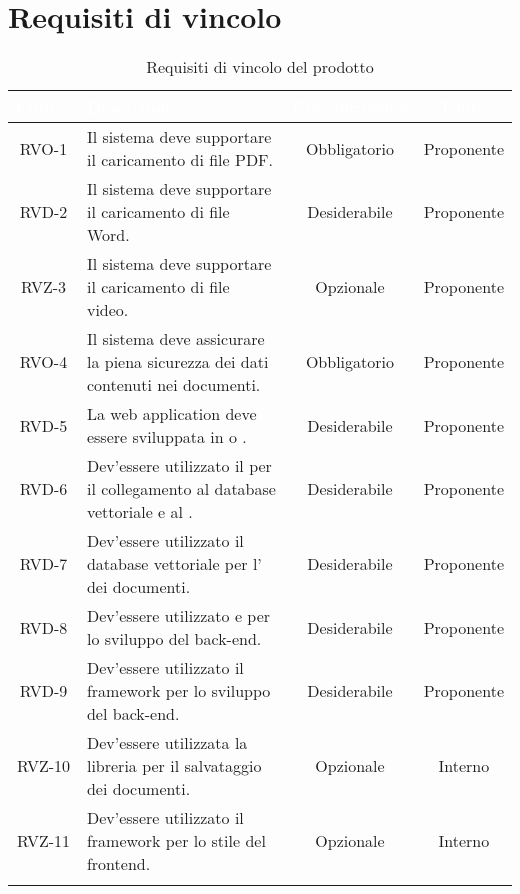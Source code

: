 \section{Requisiti di vincolo}

\begingroup
\setlength{\tabcolsep}{10pt}
\renewcommand{\arraystretch}{1.5}
\begin{xltabular}{\textwidth}{| c | X | c | c |}
    \hline
     \textbf{\textcolor{white}{Codice}} & \textbf{\textcolor{white}{Descrizione}} & \textbf{\textcolor{white}{Classificazione}} & \textbf{\textcolor{white}{Fonte}}\\
    \hline
    \endhead
    RVO-1 & Il sistema deve supportare il caricamento di file PDF. & Obbligatorio & Proponente \\
    \hline
    RVD-2 & Il sistema deve supportare il caricamento di  file Word. & Desiderabile & Proponente \\
    \hline
    RVZ-3 & Il sistema deve supportare il caricamento di  file video. & Opzionale & Proponente \\
    \hline
    RVO-4 & Il sistema deve assicurare la piena sicurezza dei dati contenuti nei documenti. & Obbligatorio & Proponente \\
    \hline
    RVD-5 & La web application deve essere sviluppata in  o . & Desiderabile & Proponente \\
    \hline
    RVD-6 & Dev'essere utilizzato il   per il collegamento al database vettoriale e al . & Desiderabile & Proponente \\
    \hline
    RVD-7 & Dev'essere utilizzato il database vettoriale  per l' dei documenti. & Desiderabile & Proponente \\
    \hline
    RVD-8 & Dev'essere utilizzato  e  per lo sviluppo del back-end. & Desiderabile & Proponente \\
    \hline
    RVD-9 & Dev'essere utilizzato il framework  per lo sviluppo del back-end. & Desiderabile & Proponente \\
    \hline
    RVZ-10 & Dev'essere utilizzata la libreria  per il salvataggio dei documenti. & Opzionale & Interno \\
    \hline
    RVZ-11 & Dev'essere utilizzato il framework  per lo stile del frontend. & Opzionale & Interno \\
    \hline
     \caption{Requisiti di vincolo del prodotto}
    \label{tab:reqvin}
\end{xltabular}
\endgroup

